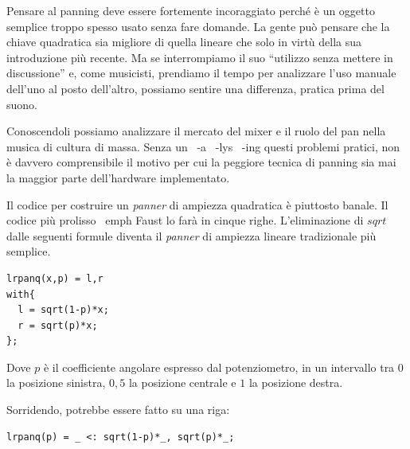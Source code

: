 Pensare al panning deve essere fortemente incoraggiato perché è un oggetto
semplice troppo spesso usato senza fare domande. La gente può pensare che la
chiave quadratica sia migliore di quella lineare che solo in virtù della sua
introduzione più recente. Ma se interrompiamo il suo “utilizzo senza mettere in
discussione” e, come musicisti, prendiamo il tempo per analizzare l'uso manuale
dell'uno al posto dell'altro, possiamo sentire una differenza, pratica prima del
suono.

Conoscendoli possiamo analizzare il mercato del mixer e il ruolo del pan nella
musica di cultura di massa. Senza un \ -a \ -lys \ -ing questi problemi pratici,
non è davvero comprensibile il motivo per cui la peggiore tecnica di panning sia
mai la maggior parte dell'hardware implementato.

Il codice per costruire un \emph{panner} di ampiezza quadratica è piuttosto banale.
Il codice più prolisso \ emph {Faust} lo farà in cinque righe. L'eliminazione di
$sqrt$ dalle seguenti formule diventa il \emph{panner} di ampiezza lineare tradizionale
più semplice.

\begin{lstlisting}
lrpanq(x,p) = l,r
with{
  l = sqrt(1-p)*x;
  r = sqrt(p)*x;
};
\end{lstlisting}

Dove $ p $ è il coefficiente angolare espresso dal potenziometro, in un
intervallo tra $ 0 $ la posizione sinistra, $ 0,5 $ la posizione centrale e $1$
la posizione destra.

Sorridendo, potrebbe essere fatto su una riga:

\begin{lstlisting}
lrpanq(p) = _ <: sqrt(1-p)*_, sqrt(p)*_;
\end{lstlisting}

